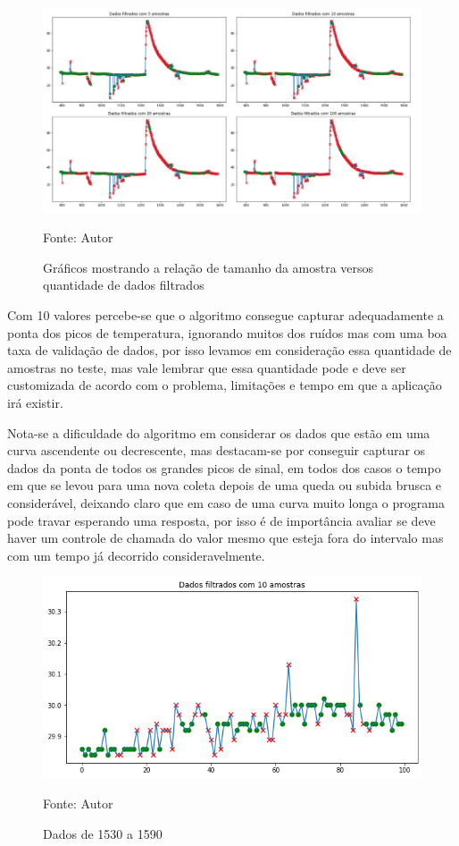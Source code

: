 \begin{figure}[H]
	\centering
	\includegraphics[width=15cm]{imagens/sensores/graficos_tamanhos_amostras.jpg}
	\caption{Gráficos mostrando a relação de tamanho da amostra versos quantidade de dados filtrados}
	Fonte: Autor
	\label{fig: graficos_tamanhos_amostras}
\end{figure}

Com 10 valores percebe-se que o algoritmo consegue capturar adequadamente a ponta dos picos de temperatura, ignorando muitos dos ruídos mas com uma boa taxa de validação de dados, por isso levamos em consideração essa quantidade de amostras no teste, mas vale lembrar que essa quantidade pode e deve ser customizada de acordo com o problema, limitações e tempo em que a aplicação irá existir.

Nota-se a dificuldade do algoritmo em considerar os dados que estão em uma curva ascendente ou decrescente, mas destacam-se por conseguir capturar os dados da ponta de todos os grandes picos de sinal, em todos dos casos o tempo em que se levou para uma nova coleta depois de uma queda ou subida brusca e considerável, deixando claro que em caso de uma curva muito longa o programa pode travar esperando uma resposta, por isso é de importância avaliar se deve haver um controle de chamada do valor mesmo que esteja fora do intervalo mas com um tempo já decorrido consideravelmente.


\begin{figure}[H]
	\centering
	\includegraphics[width=15cm]{imagens/sensores/filtrado_100_ultimas.png}
	\caption{Dados de 1530 a 1590}
	Fonte: Autor
	\label{fig: indice}
\end{figure}

